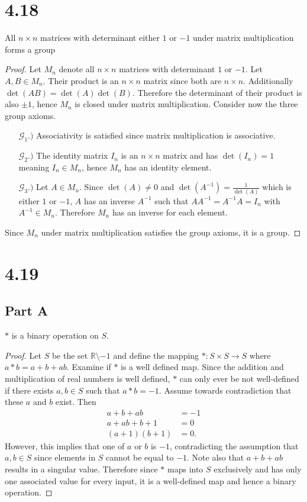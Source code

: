 \documentclass[12pt]{extarticle}
\begin{document}
\section*{4.18}
All $n \times n$ matrices with determinant either $1$ or $-1$ under matrix multiplication forms a group
\begin{proof}
	Let $M_n$ denote all $n \times n$ matrices with determinant $1$ or $-1$. Let $A,B \in M_n$. Their product is an $n \times n$ matrix since both are $n \times n$. Additionally $\det(AB) = \det(A) \det(B)$. Therefore the determinant of their product is also $\pm 1$, hence $M_n$ is closed under matrix multiplication. Consider now the three group axioms.
	\begin{enumerate}
		\item[$\mathcal{G}_1.)$]
		Associativity is satisfied since matrix multiplication is associative.
		\item[$\mathcal{G}_2.)$]
		The identity matrix $I_n$ is an $n \times n$ matrix and has $\det(I_n) = 1$ meaning $I_n \in M_n$, hence $M_n$ has an identity element.
		\item[$\mathcal{G}_3.)$]
			Let $A \in M_n$. Since $\det(A) \neq 0$ and $\det(A^{-1}) = \frac{1}{\det(A)}$ which is either $1$ or $-1$, $A$ has an inverse $A^{-1}$ such that $A A^{-1} = A^{-1} A = I_n$ with $A^{-1} \in M_n$. Therefore $M_n$ has an inverse for each element.
	\end{enumerate}

	Since $M_n$ under matrix multiplication satisfies the group axioms, it is a group.
\end{proof}

\section*{4.19}
\subsection{Part A}
$*$ is a binary operation on $S$.

\begin{proof}
	Let $S$ be the set $\mathbb{R} \setminus \qty{-1}$ and define the mapping $* : S\times S \to S$ where $a * b = a + b + ab$. Examine if $*$ is a well defined map. Since the addition and multiplication of real numbers is well defined, $*$ can only ever be not well-defined if there exists $a,b \in S$ such that $a * b = -1$. Assume towards contradiction that these $a$ and $b$ exist. Then
\begin{align*}
	a + b + ab &= -1 \\
	a + ab + b + 1 &= 0 \\
	(a+1)(b+1) &= 0
.\end{align*}
However, this implies that one of $a$ or $b$ is $-1$, contradicting the assumption that $a,b \in S$ since elements in $S$ cannot be equal to $-1$. Note also that $a + b + ab$ results in a singular value. Therefore since $*$ maps into $S$ exclusively and has only one associated value for every input, it is a well-defined map and hence a binary operation.
\end{proof}
\end{document}

